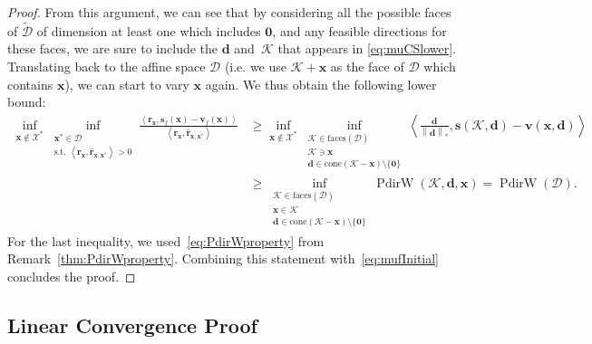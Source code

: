 \documentclass{article} %
\providecommand{\norm}[1]{\left\lVert#1\right\rVert}
\providecommand{\dualnorm}[1]{\norm{#1}_*}
\newcommand{\X}{\mathcal{X}}
\newcommand{\domain}{\mathcal{D}}
\newcommand{\x}{\bm{x}}
\newcommand{\s}{\bm{s}}
\newcommand{\dd}{\bm{d}}
\newcommand{\vv}{\bm{v}} %
\renewcommand{\r}{\bm{r}}
\newcommand{\PdirW}{\mathop{PdirW}}
\newcommand{\innerProd}[2]{\left\langle #1 , #2 \right\rangle}
\newcommand{\Kface}{\mathcal{K}}
\newcommand{\0}{\mathbf{0}} %
\begin{document}
\begin{proof}
From this argument, we can see that by considering all the possible faces of $\tilde{\domain}$ of dimension at least one which includes $\0$, and any feasible directions for these faces, we are sure to include the $\dd$ and~$\Kface$ that appears in \eqref{eq:muCSlower}. Translating back to the affine space $\domain$ (i.e. we use $\Kface+\x$ as the face of $\domain$ which contains $\x$), we can start to vary $\x$ again. We thus obtain the following lower bound:
\begin{align*}
	\inf_{\x \notin \X^*} \inf_{\substack{\x^* \in \domain\\
               \textrm{s.t. } \innerProd{\r_{\x}}{ \hat{\r}_{\x,\x^*}} > 0}}
                       \frac{\innerProd{\r_{\x}}{ \s_f(\x) - \vv_f(\x)}}{\innerProd{\r_{\x}}{ \hat{\r}_{\x,\x^*}}} 
          &\geq \inf_{\x \notin \X^*} \inf_{\substack{\Kface \in \textrm{faces}(\domain) \\
          												  \Kface \ni \x \\
          												  \dd \in \text{cone}(\Kface-\x) \setminus \{\0\} }}       												  
           \innerProd{\frac{\dd}{\dualnorm{\dd}}}{ \s(\Kface,\dd) - \vv(\x, \dd)} \\
          &\geq  \inf_{\substack{\Kface \in \textrm{faces}(\domain) \\
                    								   \x \in \Kface \\
                    								 \dd \in \text{cone}(\Kface-\x) \setminus \{\0\} }}
                    \PdirW(\Kface,\dd, \x) 
          = \PdirW(\domain) .
\end{align*}
For the last inequality, we used~\eqref{eq:PdirWproperty} from Remark~\ref{thm:PdirWproperty}. Combining this statement with~\eqref{eq:mufInitial} concludes the proof. 
\end{proof}


%
\subsection{Linear Convergence Proof}\label{sec:MFWconv}
\end{document}
